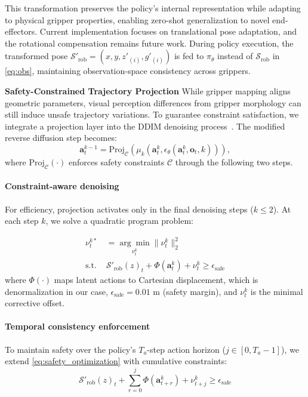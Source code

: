 This transformation preserves the policy's internal representation while adapting to physical gripper properties, enabling zero-shot generalization to novel end-effectors. Current implementation focuses on translational pose adaptation, and the rotational compensation remains future work. During policy execution, the transformed pose $\mathcal{S}'_{\text{rob}} = (x,y,z'_{(i)},g'_{(i)})$ is fed to $\pi_\theta$ instead of $\mathcal{S}_{\text{rob}}$ in \eqref{eq:obs}, maintaining observation-space consistency across grippers.


\textbf{Safety-Constrained Trajectory Projection} 
While gripper mapping aligns geometric parameters, visual perception differences from gripper morphology can still induce unsafe trajectory variations. To guarantee constraint satisfaction, we integrate a projection layer into the DDIM denoising process~\cite{song2021denoising}. The modified reverse diffusion step becomes:
%
\begin{equation}\label{eq:modified_ddim}
  \mathbf{a}^{k-1}_{t} = \text{Proj}_{\mathcal{C}}\left(\mu_{k}(\mathbf{a}^k_{t}, \epsilon_{\theta}(\mathbf{a}^k_{t},\mathbf{o}_{t},k))\right),
\end{equation}
where $\text{Proj}_{\mathcal{C}}(\cdot)$ enforces safety constraints $\mathcal{C}$ through the following two steps.

\noindent\paragraph{\textbf{Constraint-aware denoising}}
For efficiency, projection activates only in the final denoising steps ($k \leq 2$). At each step $k$, we solve a quadratic program problem:

\begin{equation}\label{eq:safety_optimization}
\begin{aligned}
    \nu^{k*}_t &= \underset{\nu^k_t}{\arg\min} \|\nu^k_t\|^2_2 \\
    \text{s.t. } & \mathcal{S}'_{\text{rob}}(z)_t + \Phi\left(\mathbf{a}^{k}_t\right) + \nu^k_t \geq \epsilon_{\text{safe}}
\end{aligned}
\end{equation}
where $\Phi(\cdot)$ maps latent actions to Cartesian displacement, which is denormalization in our case, $\epsilon_{\text{safe}} = 0.01$ m (safety margin), and $\nu^k_t$ is the minimal corrective offset.


\noindent\paragraph{\textbf{Temporal consistency enforcement}} 
To maintain safety over the policy's $T_a$-step action horizon ($j \in [0,T_a-1]$), we extend \eqref{eq:safety_optimization} with cumulative constraints:
%
\begin{equation}\label{eq:sequence_constraint}
\mathcal{S}'_{\text{rob}}(z)_{t} + \sum_{r=0}^{j}\Phi(\mathbf{a}^{k}_{t+r}) + \nu^k_{t+j} \geq \epsilon_{\text{safe}}
\end{equation}

